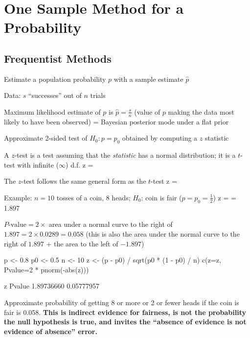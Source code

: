 \section{One Sample Method for a Probability} 
\subsection{Frequentist Methods}
\bi
\item Estimate a population probability $p$ with a sample estimate
  $\hat{p}$
\item Data: $s$ ``successes'' out of $n$ trials
\item Maximum likelihood estimate of $p$ is $\hat{p} = \frac{s}{n}$ (value of
  $p$ making the data most likely to have been observed) = Bayesian
  posterior mode  under a flat prior
\item Approximate 2-sided test of $H_{0}: p=p_{0}$ obtained by
  computing a $z$ statistic
\item A $z$-test is a test assuming that the \emph{statistic} has
  a normal distribution; it is a $t$-test with infinite ($\infty$) d.f.
\beq
z = 
\eeq
\item The $z$-test follows the same general form as the $t$-test
\beq
z = 
\eeq
\item Example: $n=10$ tosses of a coin, 8 heads; $H_{0}$: coin is fair
  ($p = p_{0}=\frac{1}{2}$)
\beq
z =  = 1.897
\eeq
\item $P\textrm{-value} = 2 \times$ area under a normal curve to the right of $1.897 =
  2 \times 0.0289 = 0.058$ (this is also the area under the normal
  curve to the right of $1.897$ + the area to the left of $-1.897$)
\begin{Schunk}
\begin{Sinput}
p  <- 0.8
p0 <- 0.5
n  <- 10
z  <- (p - p0) / sqrt(p0 * (1 - p0) / n)
c(z=z, Pvalue=2 * pnorm(-abs(z)))
\end{Sinput}
\begin{Soutput}
         z     Pvalue 
1.89736660 0.05777957 
\end{Soutput}
\end{Schunk}
\item Approximate probability of getting 8 or more or 2 or fewer heads
  if the coin is fair is 0.058.  \textbf{This is indirect evidence for
    fairness, is not the probability the null hypothesis is true, and
    invites the ``absence of evidence is not evidence of absence'' error.}
